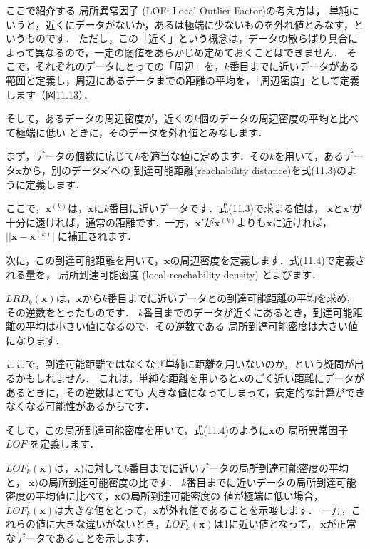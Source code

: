 ここで紹介する
局所異常因子 (LOF: Local Outlier Factor)の考え方は，
単純にいうと，近くにデータがないか，あるは極端に少ないものを外れ値とみなす，というものです．
ただし，この「近く」という概念は，データの散らばり具合によって異なるので，一定の閾値をあらかじめ定めておくことはできません．
そこで，それぞれのデータにとっての「周辺」を，$k$番目までに近いデータがある範囲と定義し，周辺にあるデータまでの距離の平均を，「周辺密度」として定義します（図11.13）．

そして，あるデータの周辺密度が，近くの$k$個のデータの周辺密度の平均と比べて極端に低い
ときに，そのデータを外れ値とみなします．


まず，データの個数に応じて$k$を適当な値に定めます．その$k$を用いて，あるデータ$\bm{x}$から，別のデータ$\bm{x}'$への
到達可能距離(reachability distance)を式(11.3)のように定義します．

ここで，$\bm{x}^{(k)}$は，$\bm{x}$に$k$番目に近いデータです．式(11.3)で求まる値は，
$\bm{x}$と$\bm{x}'$が十分に遠ければ，通常の距離です．一方，$\bm{x}'$が$\bm{x}^{(k)}$よりも$\bm{x}$に近ければ，
$|| \bm{x}-\bm{x}^{(k)} ||$に補正されます．

次に，この到達可能距離を用いて，$\bm{x}$の周辺密度を定義します．式(11.4)で定義される量を，
局所到達可能密度 (local reachability density)
とよびます．

$LRD_k(\bm{x})$は，$\bm{x}$から$k$番目までに近いデータとの到達可能距離の平均を求め，その逆数をとったものです．
$k$番目までのデータが近くにあるとき，到達可能距離の平均は小さい値になるので，その逆数である
局所到達可能密度は大きい値になります．

ここで，到達可能距離ではなくなぜ単純に距離を用いないのか，という疑問が出るかもしれません．
これは，単純な距離を用いると$\bm{x}$のごく近い距離にデータがあるときに，その逆数はとても
大きな値になってしまって，安定的な計算ができなくなる可能性があるからです．

そして，この局所到達可能密度を用いて，式(11.4)のように$\bm{x}$の
局所異常因子 $LOF$
を定義します．

$LOF_k(\bm{x})$は，$\bm{x})$に対して$k$番目までに近いデータの局所到達可能密度の平均と，
$\bm{x})$の局所到達可能密度の比です．
$k$番目までに近いデータの局所到達可能密度の平均値に比べて，$\bm{x}$の局所到達可能密度の
値が極端に低い場合，$LOF_k(\bm{x})$は大きな値をとって，$\bm{x}$が外れ値であることを示唆します．
一方，これらの値に大きな違いがないとき，$LOF_k(\bm{x})$は1に近い値となって，
$\bm{x}$が正常なデータであることを示します．

